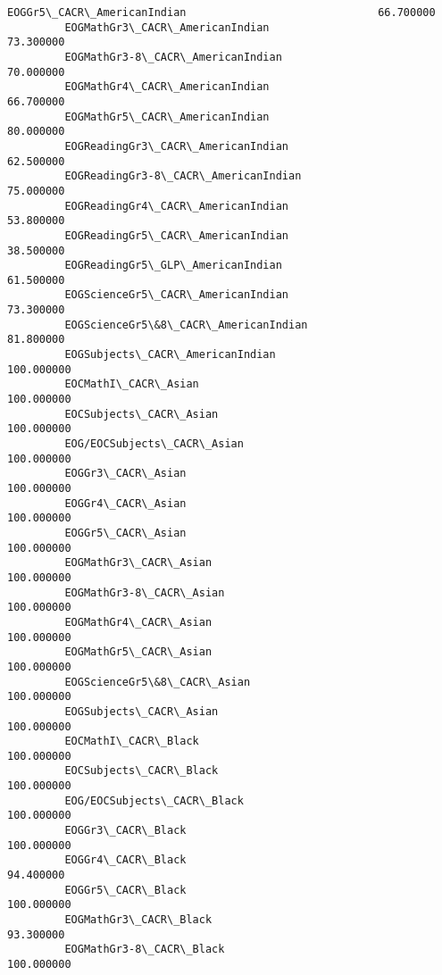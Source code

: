 \documentclass[11pt]{article}
\begin{document}
\begin{Verbatim}[commandchars=\\\{\}]
         EOGGr5\_CACR\_AmericanIndian                              66.700000  
         EOGMathGr3\_CACR\_AmericanIndian                          73.300000  
         EOGMathGr3-8\_CACR\_AmericanIndian                        70.000000  
         EOGMathGr4\_CACR\_AmericanIndian                          66.700000  
         EOGMathGr5\_CACR\_AmericanIndian                          80.000000  
         EOGReadingGr3\_CACR\_AmericanIndian                       62.500000  
         EOGReadingGr3-8\_CACR\_AmericanIndian                     75.000000  
         EOGReadingGr4\_CACR\_AmericanIndian                       53.800000  
         EOGReadingGr5\_CACR\_AmericanIndian                       38.500000  
         EOGReadingGr5\_GLP\_AmericanIndian                        61.500000  
         EOGScienceGr5\_CACR\_AmericanIndian                       73.300000  
         EOGScienceGr5\&8\_CACR\_AmericanIndian                     81.800000  
         EOGSubjects\_CACR\_AmericanIndian                        100.000000  
         EOCMathI\_CACR\_Asian                                    100.000000  
         EOCSubjects\_CACR\_Asian                                 100.000000  
         EOG/EOCSubjects\_CACR\_Asian                             100.000000  
         EOGGr3\_CACR\_Asian                                      100.000000  
         EOGGr4\_CACR\_Asian                                      100.000000  
         EOGGr5\_CACR\_Asian                                      100.000000  
         EOGMathGr3\_CACR\_Asian                                  100.000000  
         EOGMathGr3-8\_CACR\_Asian                                100.000000  
         EOGMathGr4\_CACR\_Asian                                  100.000000  
         EOGMathGr5\_CACR\_Asian                                  100.000000  
         EOGScienceGr5\&8\_CACR\_Asian                             100.000000  
         EOGSubjects\_CACR\_Asian                                 100.000000  
         EOCMathI\_CACR\_Black                                    100.000000  
         EOCSubjects\_CACR\_Black                                 100.000000  
         EOG/EOCSubjects\_CACR\_Black                             100.000000  
         EOGGr3\_CACR\_Black                                      100.000000  
         EOGGr4\_CACR\_Black                                       94.400000  
         EOGGr5\_CACR\_Black                                      100.000000  
         EOGMathGr3\_CACR\_Black                                   93.300000  
         EOGMathGr3-8\_CACR\_Black                                100.000000  

\end{Verbatim}
\end{document}
